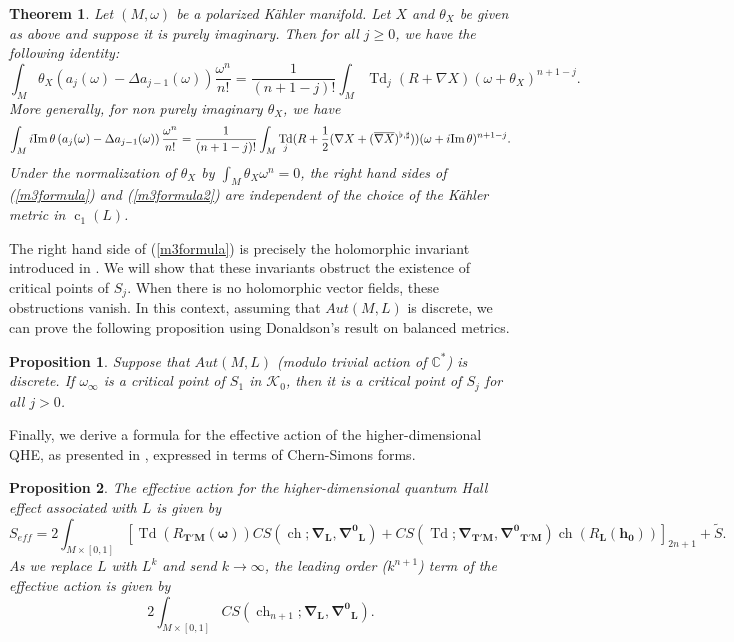 \documentclass[12pt,reqno,a4paper]{amsart}
\numberwithin{equation}{section}
\DeclareMathOperator{\Td}{Td}
\DeclareMathOperator{\ch}{ch}
\DeclareMathOperator{\cc}{c}
\def\Im{{\rm Im\,}}
\newtheorem{maintheo}{{\sc Theorem}}
\newtheorem{mainprop}{{\sc Proposition}}
\theoremstyle{remark}
\theoremstyle{dotless}
\begin{document}
\begin{maintheo}\label{m3}
Let $(M,\omega)$ be a polarized K\"ahler manifold. Let $X$ and $\theta_X$ be given as above and suppose it is purely imaginary. Then for all $j\geq 0$, we have the following identity:
\begin{equation}\label{m3formula}
\int_M \theta_X \left( a_j(\omega)-\Delta a_{j-1}(\omega) \right) \frac{\omega^n}{n!}= \frac{1}{(n+1-j)!}\int_M \Td_j(R+\nabla X)(\omega+\theta_X)^{n+1-j}.
\end{equation}
More generally, for non purely imaginary $\theta_X$, we have
\begin{equation}\label{m3formula2}
\int_M i\Im \theta \left( a_j(\omega)-\Delta a_{j-1}(\omega) \right) \frac{\omega^n}{n!}= \frac{1}{(n+1-j)!}\int_M \Td_j(R+\frac12(\nabla X +(\overline{\nabla X})^{\flat,\sharp}))(\omega+i\Im \theta)^{n+1-j}.
\end{equation}
Under the normalization of $\theta_X$ by $\int_M \theta_X \omega^n =0$, the right hand sides of (\ref{m3formula}) and (\ref{m3formula2}) are independent of the choice of the K\"ahler metric in $\cc_1(L)$.
\end{maintheo}

The right hand side of (\ref{m3formula}) is precisely the holomorphic invariant introduced in \cite{futaki2004asymptotic}. We will show that these invariants obstruct the existence of critical points of $S_j$. When there is no holomorphic vector fields, these obstructions vanish. In this context, assuming that $Aut(M,L)$ is discrete, we can prove the following proposition using Donaldson's result \cite{donaldson2001scalar} on balanced metrics.

\begin{mainprop}\label{m4}
Suppose that $Aut(M,L)$ (modulo trivial action of $\mathbb{C}^*$) is discrete. If $\omega_\infty$ is a critical point of $S_1$ in $\mathcal{K}_0$, then it is a critical point of $S_j$ for all $j>0$.
\end{mainprop}

Finally, we derive a formula for the effective action of the higher-dimensional QHE, as presented in \cite{karabali2016geometry}, expressed in terms of Chern-Simons forms.

\begin{mainprop}\label{m5}
The effective action for the higher-dimensional quantum Hall effect associated with $L$ is given by
\begin{equation}\label{eff}
S_{eff}=2\int_{M\times [0,1]} \left[\Td(R_{\mathbf{T'M}}(\boldsymbol{\omega}))CS(\ch;\boldsymbol{\nabla}_\mathbf{L},\boldsymbol{\nabla^0}_\mathbf{L})+ CS(\Td;\boldsymbol{\nabla}_\mathbf{T'M},\boldsymbol{\nabla^0}_\mathbf{T'M})\ch(R_\mathbf{L}(\mathbf{h_0})) \right]_{2n+1}+\widetilde{S}.
\end{equation}
As we replace $L$ with $L^k$ and send $k\rightarrow \infty$, the leading order ($k^{n+1}$) term of the effective action is given by 
\begin{equation*}
2\int_{M\times[0,1]} CS(\ch_{n+1};\boldsymbol{\nabla}_\mathbf{L},\boldsymbol{\nabla^0}_\mathbf{L}).
\end{equation*}
\end{mainprop}
\end{document}
